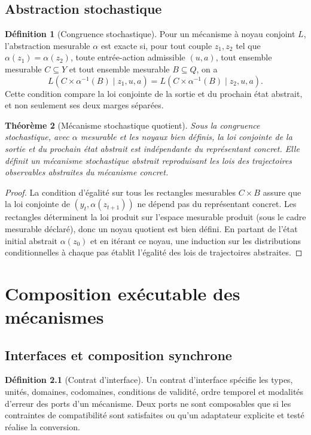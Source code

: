 \documentclass[11pt,oneside]{book}
\newtheorem{theoreme}{Théorème}[chapter]
\theoremstyle{definition}
\newtheorem{definition}[theoreme]{Définition}
\theoremstyle{remark}
\newcommand{\1}{\mathbf 1}
\begin{document}
\section{Abstraction stochastique}
\begin{definition}[Congruence stochastique]
Pour un mécanisme à noyau conjoint $L$, l'abstraction mesurable $\alpha$ est exacte si, pour tout couple $z_1,z_2$ tel que $\alpha(z_1)=\alpha(z_2)$, toute entrée-action admissible $(u,a)$, tout ensemble mesurable $C\subseteq Y$ et tout ensemble mesurable $B\subseteq Q$, on a
\[
L(C\times\alpha^{-1}(B)\mid z_1,u,a)=L(C\times\alpha^{-1}(B)\mid z_2,u,a).
\]
Cette condition compare la loi conjointe de la sortie et du prochain état abstrait, et non seulement ses deux marges séparées.\end{definition}

\begin{theoreme}[Mécanisme stochastique quotient]
Sous la congruence stochastique, avec $\alpha$ mesurable et les noyaux bien définis, la loi conjointe de la sortie et du prochain état abstrait est indépendante du représentant concret. Elle définit un mécanisme stochastique abstrait reproduisant les lois des trajectoires observables abstraites du mécanisme concret.
\end{theoreme}
\begin{proof}
La condition d'égalité sur tous les rectangles mesurables $C\times B$ assure que la loi conjointe de $(y_t,\alpha(z_{t+1}))$ ne dépend pas du représentant concret. Les rectangles déterminent la loi produit sur l'espace mesurable produit (sous le cadre mesurable déclaré), donc un noyau quotient est bien défini. En partant de l'état initial abstrait $\alpha(z_0)$ et en itérant ce noyau, une induction sur les distributions conditionnelles à chaque pas établit l'égalité des lois de trajectoires abstraites.\end{proof}

\chapter{Composition exécutable des mécanismes}
\section{Interfaces et composition synchrone}
\begin{definition}[Contrat d'interface]
Un contrat d'interface spécifie les types, unités, domaines, codomaines, conditions de validité, ordre temporel et modalités d'erreur des ports d'un mécanisme. Deux ports ne sont composables que si les contraintes de compatibilité sont satisfaites ou qu'un adaptateur explicite et testé réalise la conversion.
\end{definition}
\end{document}
